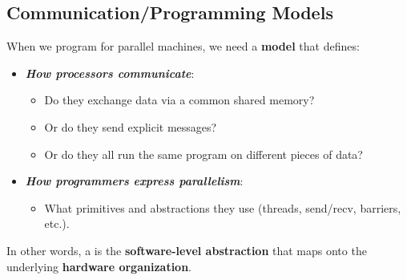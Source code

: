 \subsection{Communication/Programming Models}

When we program for parallel machines, we need a \textbf{model} that defines:
\begin{itemize}
    \item \textbf{\emph{How processors communicate}}:
    \begin{itemize}
        \item Do they exchange data via a common shared memory?
        \item Or do they send explicit messages?
        \item Or do they all run the same program on different pieces of data?
    \end{itemize}
    \item \textbf{\emph{How programmers express parallelism}}:
    \begin{itemize}
        \item What primitives and abstractions they use (threads, send/recv, barriers, etc.).
    \end{itemize}
\end{itemize}
In other words, a  is the \textbf{software-level abstraction} that maps onto the underlying \textbf{hardware organization}.

